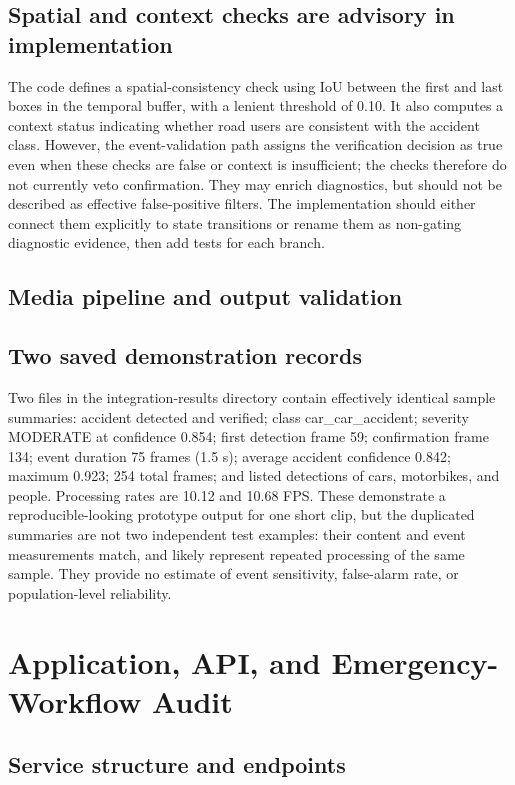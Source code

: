 \documentclass[12pt,a4paper]{article}
\begin{document}
\subsection{Spatial and context checks are advisory in implementation}
The code defines a spatial-consistency check using IoU between the first and last boxes in the temporal buffer, with a lenient threshold of 0.10. It also computes a context status indicating whether road users are consistent with the accident class. However, the event-validation path assigns the verification decision as true even when these checks are false or context is insufficient; the checks therefore do not currently veto confirmation. They may enrich diagnostics, but should not be described as effective false-positive filters. The implementation should either connect them explicitly to state transitions or rename them as non-gating diagnostic evidence, then add tests for each branch.

\subsection{Media pipeline and output validation}

\subsection{Two saved demonstration records}
Two files in the integration-results directory contain effectively identical sample summaries: accident detected and verified; class car\_car\_accident; severity MODERATE at confidence 0.854; first detection frame 59; confirmation frame 134; event duration 75 frames (1.5 s); average accident confidence 0.842; maximum 0.923; 254 total frames; and listed detections of cars, motorbikes, and people. Processing rates are 10.12 and 10.68 FPS. These demonstrate a reproducible-looking prototype output for one short clip, but the duplicated summaries are not two independent test examples: their content and event measurements match, and likely represent repeated processing of the same sample. They provide no estimate of event sensitivity, false-alarm rate, or population-level reliability.

\section{Application, API, and Emergency-Workflow Audit}
\subsection{Service structure and endpoints}
\end{document}
